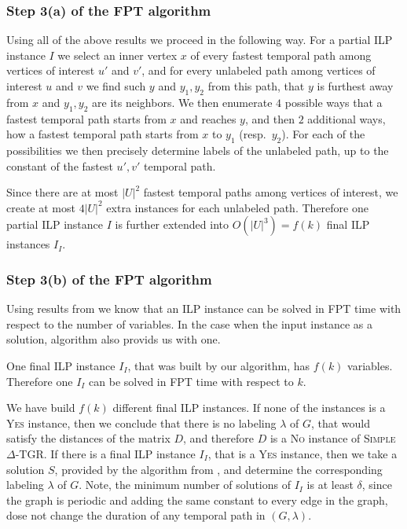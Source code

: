\documentclass[11pt,a4paper]{article}
\theoremstyle{remark}
\theoremstyle{definition}
\newcommand{\deltaExact}{\textsc{Simple $\Delta$-TGR}}
\begin{document}
\subsubsection*{Step 3(a) of the FPT algorithm}
Using all of the above results we proceed in the following way.
For a partial ILP instance $I$ we 
select an inner vertex $x$ of every fastest temporal path among vertices of interest $u'$ and $v'$,
and for every unlabeled path among vertices of interest $u$ and $v$ we find such $y$ and $y_1, y_2$ from this path, that $y$ is furthest away from $x$ and $y_1, y_2$ are its neighbors.
We then enumerate $4$ possible ways that a fastest temporal path starts from $x$ and reaches $y$, 
and then $2$ additional ways, how a fastest temporal path starts from $x$ to $y_1$ (resp.~$y_2$).
For each of the possibilities we then precisely determine labels of the unlabeled path, up to the constant of the fastest $u',v'$ temporal path.

Since there are at most $|U|^2$ fastest temporal paths among vertices of interest, we create at most $4|U|^2$ extra instances for each unlabeled path.
Therefore one partial ILP instance $I$ is further extended into $O(|U|^3)=f(k)$  final ILP instances $I_I$.

\subsubsection*{Step 3(b) of the FPT algorithm}
Using results from \cite{Lenstra1983Integer} we know that an ILP instance can be solved in FPT time with respect to the number of variables. In the case when the input instance as a solution, algorithm also provids us with one.

One final ILP instance $I_I$, that was built by our algorithm, has $f(k)$ variables. 
Therefore one $I_I$ can be solved in FPT time with respect to $k$.

We have build $f(k)$ different final ILP instances. If none of the instances is a \textsc{Yes} instance, then we conclude that there is no labeling $\lambda$ of $G$, that would satisfy the distances of the matrix $D$,
and therefore $D$ is a \textsc{No} instance of \deltaExact.
If there is a final ILP instance $I_I$, that is a \textsc{Yes} instance, then we take a solution $S$, provided by the algorithm from \cite{Lenstra1983Integer}, and determine the corresponding labeling $\lambda$ of $G$.
Note, the minimum number of solutions of $I_I$ is at least $\delta$, since the graph is periodic and adding the same constant to every edge in the graph, dose not change the duration of any temporal path in $(G, \lambda)$.
\end{document}
